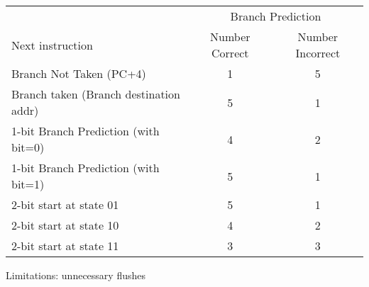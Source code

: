 
\begin{frame}[fragile]
{\footnotesize
    \begin{tabular}{l|c|c}
 & \multicolumn{2}{c}{Branch Prediction}\\
Next instruction & Number Correct & Number Incorrect\\
\hline\hline
Branch Not Taken (PC+4) & 1 & 5 \\\hline
Branch taken (Branch destination addr) & 5& 1\\\hline\hline
1-bit Branch Prediction (with bit=0) & 4 &2 \\\hline

1-bit Branch Prediction (with bit=1) & 5 & 1\\\hline
\hline
2-bit start at state 01 & 5  &1 \\\hline
2-bit start at state 10 & 4 & 2\\\hline
2-bit start at state 11 & 3 & 3 \\\hline
\end{tabular}
}
\bigskip
\bigskip

Limitations: unnecessary flushes
\end{frame}

